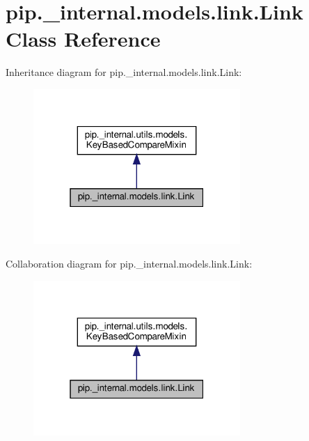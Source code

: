 \hypertarget{classpip_1_1__internal_1_1models_1_1link_1_1Link}{}\section{pip.\+\_\+internal.\+models.\+link.\+Link Class Reference}
\label{classpip_1_1__internal_1_1models_1_1link_1_1Link}


Inheritance diagram for pip.\+\_\+internal.\+models.\+link.\+Link\+:
\nopagebreak
\begin{figure}[H]
\begin{center}
\leavevmode
\includegraphics[width=223pt]{classpip_1_1__internal_1_1models_1_1link_1_1Link__inherit__graph}
\end{center}
\end{figure}


Collaboration diagram for pip.\+\_\+internal.\+models.\+link.\+Link\+:
\nopagebreak
\begin{figure}[H]
\begin{center}
\leavevmode
\includegraphics[width=223pt]{classpip_1_1__internal_1_1models_1_1link_1_1Link__coll__graph}
\end{center}
\end{figure}
